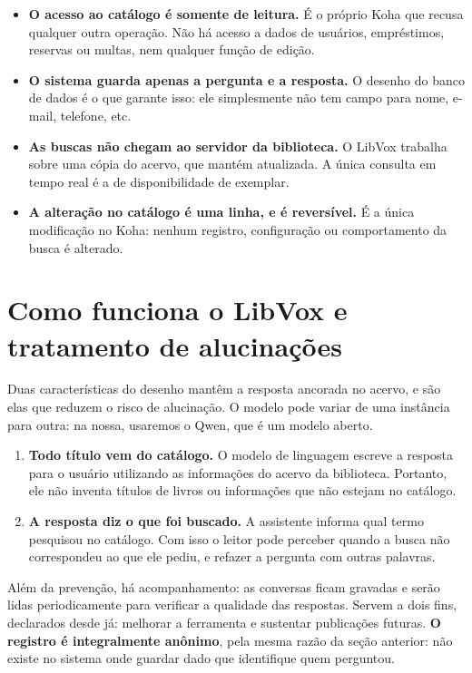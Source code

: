 \documentclass[11pt,a4paper]{article}
\begin{document}
\begin{itemize}
  \item \textbf{O acesso ao catálogo é somente de leitura.} É o próprio Koha que
        recusa qualquer outra operação. Não há acesso a dados de usuários,
        empréstimos, reservas ou multas, nem qualquer função de edição.
  \item \textbf{O sistema guarda apenas a pergunta e a resposta.} O desenho do
        banco de dados é o que garante isso: ele simplesmente não tem campo para
        nome, e-mail, telefone, etc.
  \item \textbf{As buscas não chegam ao servidor da biblioteca.} O LibVox
        trabalha sobre uma cópia do acervo, que mantém atualizada. A única
        consulta em tempo real é a de disponibilidade de exemplar.
  \item \textbf{A alteração no catálogo é uma linha, e é reversível.} É a única
        modificação no Koha: nenhum registro, configuração ou comportamento da
        busca é alterado.
\end{itemize}

\section{Como funciona o LibVox e tratamento de alucinações}

Duas características do desenho mantêm a resposta ancorada no acervo, e são elas
que reduzem o risco de alucinação. O modelo pode variar de uma instância para
outra: na nossa, usaremos o Qwen, que é um modelo aberto.

\begin{enumerate}
  \item \textbf{Todo título vem do catálogo.} O modelo de linguagem escreve a
        resposta para o usuário utilizando as informações do acervo da
        biblioteca. Portanto, ele não inventa títulos de livros ou informações
        que não estejam no catálogo.

  \item \textbf{A resposta diz o que foi buscado.} A assistente informa qual
        termo pesquisou no catálogo. Com isso o leitor pode perceber quando a
        busca não correspondeu ao que ele pediu, e refazer a pergunta com outras
        palavras.
\end{enumerate}

Além da prevenção, há acompanhamento: as conversas ficam gravadas e serão lidas
periodicamente para verificar a qualidade das respostas. Servem a dois fins,
declarados desde já: melhorar a ferramenta e sustentar publicações futuras.
\textbf{O registro é integralmente anônimo}, pela mesma razão da seção anterior:
não existe no sistema onde guardar dado que identifique quem perguntou.
\end{document}
